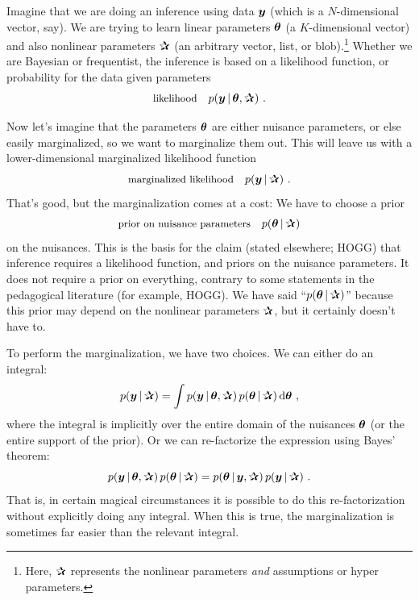 Imagine that we are doing an inference using data $\boldsymbol{y}$ (which is a
$N$-dimensional vector, say).
We are trying to learn linear parameters $\boldsymbol{\theta}$ (a $K$-dimensional vector)
and also nonlinear parameters $\bP$ (an arbitrary vector, list, or
blob).\footnote{Here, $\bP$ represents the nonlinear parameters \emph{and}
assumptions or hyper parameters.}
Whether we are Bayesian or frequentist, the inference is based on
a likelihood function, or probability for the data given parameters
\begin{equation}
\mbox{\small likelihood} \quad p(\vy\given\vtheta,\bP) ~.
\end{equation}

Now let's imagine that the parameters $\boldsymbol{\theta}$ are either nuisance
parameters, or else easily marginalized, so we want to marginalize
them out.
This will leave us with a lower-dimensional marginalized likelihood
function
\begin{equation}
\mbox{\small marginalized likelihood} \quad p(\vy\given\bP) ~.
\end{equation}
That's good, but the marginalization comes at a cost:
We have to choose a prior
\begin{equation}
\mbox{\small prior on nuisance parameters} \quad p(\vtheta\given\bP)
\end{equation}
on the nuisances.
This is the basis for the claim (stated elsewhere; HOGG) that
inference requires a likelihood function, and priors on the nuisance parameters.
It does not require a prior on everything, contrary to some statements
in the pedagogical literature (for example, HOGG).
We have said ``$p(\vtheta\given\bP)$'' because this prior may depend on
the nonlinear parameters $\bP$, but it certainly doesn't have to.

To perform the marginalization, we have two choices.
We can either do an integral:
\begin{equation}
p(\vy\given\bP) = \int p(\vy\given\vtheta,\bP)\,p(\vtheta\given\bP)\,\dd\vtheta
~,
\end{equation}
where the integral is implicitly over the entire domain of the
nuisances $\boldsymbol{\theta}$ (or the entire support of the prior).
Or we can re-factorize the expression using Bayes' theorem:
\begin{equation}
p(\vy\given\vtheta,\bP)\,p(\vtheta\given\bP)
 = p(\vtheta\given\vy,\bP)\,p(\vy\given\bP)
~.
\end{equation}
That is, in certain magical circumstances it is possible to do this
re-factorization without explicitly doing any integral.
When this is true, the marginalization is sometimes far easier than
the relevant integral.


